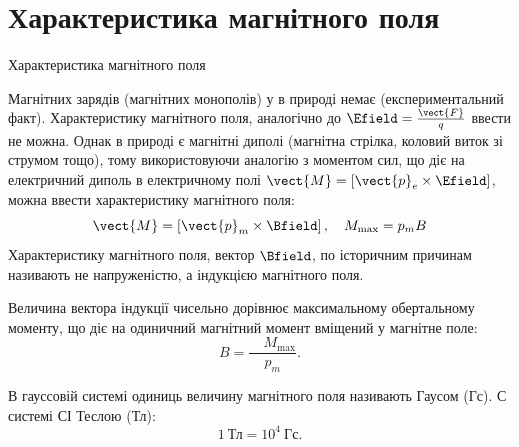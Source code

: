 \documentclass{beamer}
\begin{document}
\section{Характеристика магнітного поля}



\begin{frame}{Характеристика магнітного поля}{}\small
	\begin{block}{}\justifying
		Магнітних зарядів (магнітних монополів) у в природі немає (експериментальний факт). Характеристику магнітного поля, аналогічно до $\Efield =
			\frac{\vect{F}}{q}$
		ввести не можна. Однак в природі є магнітні диполі (магнітна стрілка, коловий виток зі струмом тощо), тому використовуючи аналогію з моментом
		сил, що діє на електричний диполь в електричному полі $ \vect{M} = \left[\vect{p}_e \times\Efield\right] $, можна ввести характеристику
		магнітного поля:
		\begin{equation*}
			\vect{M} = \left[\vect{p}_m \times\Bfield\right], \quad M_{\max} = p_m B
		\end{equation*}
		Характеристику магнітного поля, вектор $\Bfield$, по історичним причинам називають не \alert{напруженістю}, а \alert{індукцією} магнітного поля.
	\end{block}
	\begin{overprint}
		\begin{block}{}\justifying
			Величина вектора індукції чисельно дорівнює максимальному обертальному моменту, що діє на одиничний магнітний момент вміщений у магнітне поле:
			\begin{equation*}
				B = \frac{\quad M_{\max}}{p_m}.
			\end{equation*}
		\end{block}
		\begin{alertblock}{}\justifying
			В гауссовій системі одиниць величину магнітного поля називають Гаусом (Гс). С системі СІ Теслою (Тл):
			\begin{equation*}
				1\ \text{Тл} = 10^4\ \text{Гс}.
			\end{equation*}
		\end{alertblock}
	\end{overprint}
\end{frame}
\end{document}
